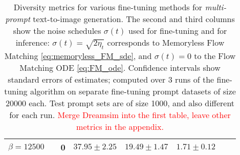 \documentclass[]{fairmeta}
\begin{document}
\begin{table}[h]
{\begin{tabular}{lccccccc}
    $\beta = 12500$                    &                                    & 0                 & $37.95 \pm 2.25$ & $19.49 \pm 1.47$ & $1.71 \pm 0.12$ \\
    \bottomrule
\end{tabular}
}
\caption{Diversity metrics for various fine-tuning methods for \textit{multi-prompt} text-to-image generation. The second and third columns show the noise schedules $\sigma(t)$ used for fine-tuning and for inference: $\sigma(t) = \sqrt{2\eta_t}$ corresponds to Memoryless Flow Matching \eqref{eq:memoryless_FM_sde}, and $\sigma(t) = 0$ to the Flow Matching ODE \eqref{eq:FM_ode}. Confidence intervals show standard errors of estimates; computed over 3 runs of the fine-tuning algorithm on separate fine-tuning prompt datasets of size 20000 each. Test prompt sets are of size 1000, and also different for each run. \textcolor{red}{Merge Dreamsim into the first table, leave other metrics in the appendix.}}
\label{table:metrics_multiprompt}
\end{table}
\end{document}
